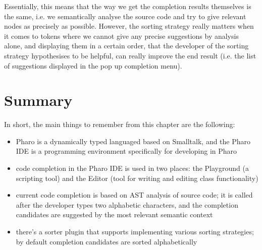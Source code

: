 Essentially, this means that the way we get the completion results themselves is the same, i.e. we semantically analyse the source code and try to give relevant nodes as precisely as possible. However, the sorting strategy really matters when it comes to tokens where we cannot give any precise suggestions by analysis alone, and displaying them in a certain order, that the developer of the sorting strategy hypothesises to be helpful, can really improve the end result (i.e. the list of suggestions displayed in the pop up completion menu).

\section{Summary}
\label{sec:PharoCompletion-Summary}
In short, the main things to remember from this chapter are the following:
\begin{itemize}
    \item Pharo is a dynamically typed languaged based on Smalltalk, and the Pharo IDE is a programming environment specifically for developing in Pharo
    \item code completion in the Pharo IDE is used in two places: the Playground (a scripting tool) and the Editor (tool for writing and editing class functionality)
    \item current code completion is based on AST analysis of source code; it is called after the developer types two alphabetic characters, and the completion candidates are suggested by the most relevant semantic context
    \item there's a sorter plugin that supports implementing various sorting strategies; by default completion candidates are sorted alphabetically
\end{itemize}